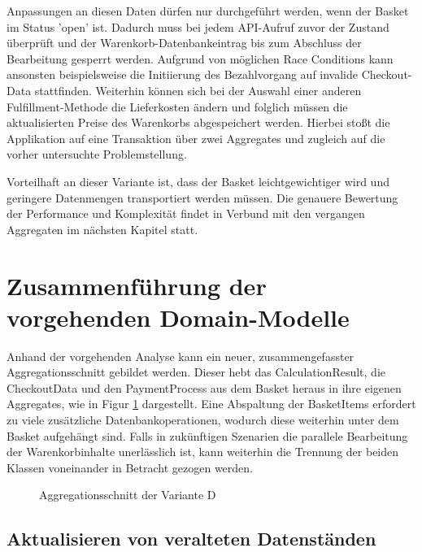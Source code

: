 Anpassungen an diesen Daten dürfen nur durchgeführt werden, wenn der Basket im Status 'open' ist. Dadurch muss bei jedem API-Aufruf zuvor der Zustand überprüft und der Warenkorb-Datenbankeintrag bis zum Abschluss der Bearbeitung gesperrt werden. Aufgrund von möglichen Race Conditions kann ansonsten beispielsweise die Initiierung des Bezahlvorgang auf invalide Checkout-Data stattfinden. Weiterhin können sich bei der Auswahl einer anderen Fulfillment-Methode die Lieferkosten ändern und folglich müssen die aktualisierten Preise des Warenkorbs abgespeichert werden. Hierbei stoßt die Applikation auf eine Transaktion über zwei Aggregates und zugleich auf die vorher untersuchte Problemstellung.

Vorteilhaft an dieser Variante ist, dass der Basket leichtgewichtiger wird und geringere Datenmengen transportiert werden müssen. Die genauere Bewertung der Performance und Komplexität findet in Verbund mit den vergangen Aggregaten im nächsten Kapitel statt.


\section{Zusammenführung der vorgehenden Domain-Modelle}

Anhand der vorgehenden Analyse kann ein neuer, zusammengefasster Aggregationsschnitt gebildet werden.  Dieser hebt das CalculationResult, die CheckoutData und den PaymentProcess aus dem Basket heraus in ihre eigenen Aggregates, wie in Figur \ref{fig:VarD} dargestellt. Eine Abspaltung der BasketItems erfordert zu viele zusätzliche Datenbankoperationen, wodurch diese weiterhin unter dem Basket aufgehängt sind. Falls in zukünftigen Szenarien die parallele Bearbeitung der Warenkorbinhalte unerlässlich ist, kann weiterhin die Trennung der beiden Klassen voneinander in Betracht gezogen werden.  

\begin{figure}[htbp]
	\centering
	
	\caption{Aggregationsschnitt der Variante D}
	\label{fig:VarD}
\end{figure}

\subsection{Aktualisieren von veralteten Datenständen}

